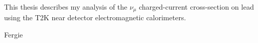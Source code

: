 \begin{preface}
  \noindent
  This thesis describes my analysis of the $\nu_\mu$ charged-current cross-section on lead using the 
  T2K near detector electromagnetic calorimeters.

\end{preface}

\tableofcontents


%
  {Fergie}
\thispagestyle{empty}
